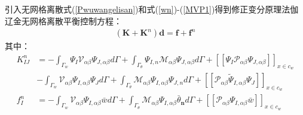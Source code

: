 引入无网格离散式(\ref{Pwuwangelisan})和式(\ref{wn})-(\ref{MVP1})得到修正变分原理法伽辽金无网格离散平衡控制方程：
\begin{equation}
\begin{split}
    (\pmb{K}+\pmb{K}^n)\pmb{d}=\pmb{f}+\pmb{f}^n
\end{split}
\end{equation}
其中：
\begin{equation}
\begin{split}
     K^n_{IJ}&=-\int_{\Gamma_w}\Psi_I\mathcal{V}_{\alpha\beta}\Psi_{J,\alpha\beta}d\Gamma+\int_{\Gamma_{\theta}}\Psi_{I,n}\mathcal{M}_{\alpha\beta}\Psi_{J,\alpha\beta}d\Gamma+[[\Psi_I\mathcal{P}_{\alpha\beta}\Psi_{J,\alpha\beta}]]_{x\in{c_w}}\\
     &-\int_{\Gamma_w}\mathcal{V}_{\alpha\beta}\Psi_{I,\alpha\beta}\Psi_Jd\Gamma+\int_{\Gamma_{\theta}}\mathcal{M}_{\alpha\beta}\Psi_{I,\alpha\beta}\Psi_{J,n}d\Gamma+[[\mathcal{P}_{\alpha\beta}\tilde{\Psi}_{I,\alpha\beta}\Psi_J]]_{x\in{c_w}}\\
     f_{I}^n&=-\int_{\Gamma_w}\mathcal{V}_{\alpha\beta}\Psi_{I,\alpha\beta}\bar{w}d\Gamma+\int_{\Gamma_{\theta}}\mathcal{M}_{\alpha\beta}\Psi_{I,\alpha\beta}\bar{\theta}_{\pmb n}d\Gamma+[[\mathcal{P}_{\alpha\beta}\Psi_{I,\alpha\beta}\bar{w}]]_{x\in{c_w}}
\end{split}
\end{equation}\par
